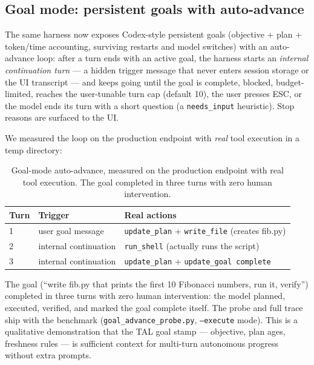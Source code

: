 \documentclass[10pt]{article}
\begin{document}
\subsection{Goal mode: persistent goals with auto-advance}
\label{sec:goalmode}

The same harness now exposes Codex-style persistent goals (objective + plan +
token/time accounting, surviving restarts and model switches) with an
auto-advance loop: after a turn ends with an active goal, the harness starts an
\emph{internal continuation turn} --- a hidden trigger message that never enters
session storage or the UI transcript --- and keeps going until the goal is
complete, blocked, budget-limited, reaches the user-tunable turn cap (default
10), the user presses ESC, or the model ends its turn with a short question (a
\texttt{needs\_input} heuristic). Stop reasons are surfaced to the UI.

We measured the loop on the production endpoint with \emph{real} tool execution in
a temp directory:

\begin{table}[h]
  \centering
  \small
  \begin{tabular}{lll}
    \toprule
    Turn & Trigger & Real actions \\
    \midrule
    1 & user goal message & \texttt{update\_plan} + \texttt{write\_file} (creates fib.py) \\
    2 & internal continuation & \texttt{run\_shell} (actually runs the script) \\
    3 & internal continuation & \texttt{update\_plan} + \texttt{update\_goal complete} \\
    \bottomrule
  \end{tabular}
  \caption{Goal-mode auto-advance, measured on the production endpoint with real
  tool execution. The goal completed in three turns with zero human intervention.}
  \label{tab:goaladvance}
\end{table}

The goal (``write fib.py that prints the first 10 Fibonacci numbers, run it,
verify'') completed in three turns with zero human intervention: the model
planned, executed, verified, and marked the goal complete itself. The probe and
full trace ship with the benchmark (\texttt{goal\_advance\_probe.py},
\texttt{--execute} mode). This is a qualitative demonstration that the TAL goal
stamp --- objective, plan ages, freshness rules --- is sufficient context for
multi-turn autonomous progress without extra prompts.
\end{document}
